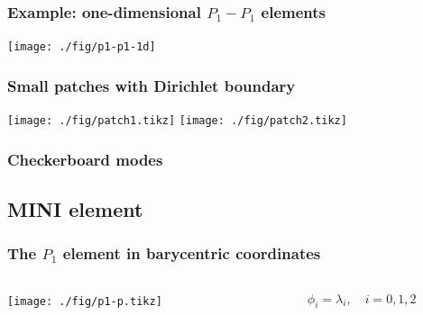\documentclass[ignorenonframetext,notheorems,aspectratio=1610]{beamer}
\begin{document}

\begin{frame}
  \frametitle{Example: one-dimensional $P_1-P_1$ elements}
  \begin{center}
      \texttt{[image: ./fig/p1-p1-1d]}
  \end{center}
\end{frame}

\begin{frame}
  \frametitle{Small patches with Dirichlet boundary}
  \begin{center}
    \hfill
    \texttt{[image: ./fig/patch1.tikz]}
    \hfill
    \texttt{[image: ./fig/patch2.tikz]}
    \hfill\mbox{}
  \end{center}
\end{frame}

\begin{frame}
  \frametitle{Checkerboard modes}
  
\end{frame}

\subsection{MINI element}

\begin{frame}
  \frametitle{The $P_1$ element in barycentric coordinates}
  \begin{columns}
    \begin{column}{.5\textwidth}
      \begin{center}
        \texttt{[image: ./fig/p1-p.tikz]}
      \end{center}
    \end{column}
    \begin{column}{.5\textwidth}
      \begin{gather*}
        \phi_i = \lambda_i,
        \quad i=0,1,2
      \end{gather*}
    \end{column}
  \end{columns}
\end{frame}
\end{document}
